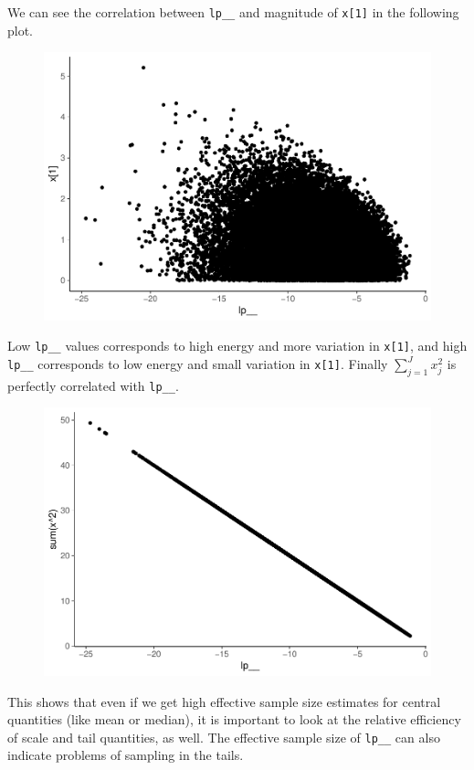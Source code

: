 \documentclass[american,]{article}
\begin{document}
We can see the correlation between \texttt{lp\_\_} and magnitude of
\texttt{x{[}1{]}} in the following plot.

\begin{figure}[tp]
  \centering
  \includegraphics[width=0.6\linewidth]{graphics/qplot-fit-n-1.pdf}
\end{figure}

Low \texttt{lp\_\_} values corresponds to high energy and more variation
in \texttt{x{[}1{]}}, and high \texttt{lp\_\_} corresponds to low energy
and small variation in \texttt{x{[}1{]}}. Finally \(\sum_{j=1}^J x_j^2\)
is perfectly correlated with \texttt{lp\_\_}.

\begin{figure}[tp]
  \centering
  \includegraphics[width=0.6\linewidth]{graphics/qplot-fit-n-2-1.pdf}
\end{figure}

This shows that even if we get high effective sample size estimates for
central quantities (like mean or median), it is important to look at the
relative efficiency of scale and tail quantities, as well. The effective
sample size of \texttt{lp\_\_} can also indicate problems of sampling in
the tails.

\newpage

\hypertarget{refs}{}


\end{document}
